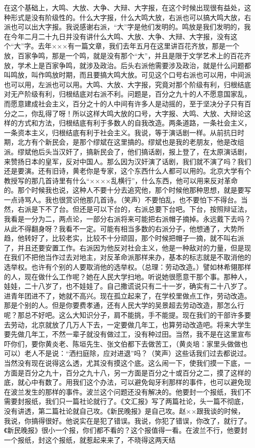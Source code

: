 在这个基础上，大鸣、大放、大争、大辩、大字报，在这个时候出现很有益处，这种形式是没有阶级性的。什么大字报，什么大鸣大放，右派也可以搞大鸣大放，右派也可以出大字报。我说感谢右派，“大”字是他们发明的。鸣放是我们发明的，我在今年二月二十九日并没有讲什么大鸣、大放、大争、大辩、大字报，没有这个“大”字。去年×××有一篇文章，我们去年五月在这里讲百花齐放，那是一个放，百家争鸣，那是一个鸣，就是没有那个“大”，并且是限于文学艺术上的百花齐放，学术上是百家争鸣，就涉及政治。后头右派他需要涉及政治，就是什么问题都叫鸣放，叫作鸣放时期，而且要搞大鸣大放。可见这个口号右派也可以用，中间派也可以用，左派也可以用。大鸣、大放、大字报，究竟对那个阶级有利，归根结底对无产阶级有利，归根结底对右派不利。问题是，百分之九十的人不愿意国家乱，而愿意建成社会主义，百分之十的人中间有许多人是动摇的，至于坚决分子只有百分之二，你乱得了呀！所以这样大鸣大放的口号，大字报、大鸣、大放、大辩论这样的方式和方法，归根结底有利于多数人的自我改造。两条道路，一条社会主义，一条资本主义，归根结底有利于社会主义。我说，等于演话剧一样。从前抗日时期，北方有个新民会，是那个缪斌在这里搞的。缪斌也是我的老朋友，他是改组派。缪斌他后头当汉奸了，搞新民会了，他们搞话剧，报上登了，在太原演话剧，来赞扬日本的皇军，反对中国人。那么因为汉奸演了话剧，我们就不演了吗？我们还是要演。还有旧诗，黄老你是专家，这个东西什么人都可以用的。北京大学有个教授写的那几首诗里有什么“××××乱横行”，什么东西，他可以用来反对革命的。那个时候我也说，这种人不要十分去追究他，那个时候他那种思想，就是要写一点诗骂人。我也很赏识他那几首诗。（笑声）不要怕乱，也不要怕下不得台。当然，右派是下不了台。但还是可以下台的，右派总要下台吧。下台，按照辩证法，我看是一分为二，两点论，一部分右派将来可能把右派帽子摘掉。永远戴下去吗？从此不得翻身呀？我看不一定。可能有相当多数的右派分子，他想通了，大势所趋，他转好了，比较老实，比较不十分顽固，那个时候把帽子一摘，就不叫右派了，并且还要安置工作。右派因为他反对社会主义，他是一种敌对的力量，但是现在我们不把他当作过去对地主，对反革命派那样来办，基本的标志就是不取消他的选举权。也许有个别的人要取消他的选举权。（总理：劳动改造。）譬如林希翎那样的人，现在做什么工作呢？她在人民大学扫地。听说她很愿意干那个事。那种人，娃娃，二十八岁了，也不娃娃了。自己撒谎说只有二十一岁，确实有二十八岁了。进青年团进不了，她就不高兴。现在孤立起来了，在学校里做点工作，劳动改造。那是个别的人。但是你要费孝通，还有人民大学的吴景超去劳动改造，那怎么行呢？那总不好吧。这么大知识分子，肩不能挑，手不能提。现在我们的干部许多要去劳动，北京就放了几万人下去，一定要做几年工，也算劳动改造吧。将来大学生要先做几年工，不然一辈子就没有做过工，没有种过田。当然，我不是在这里宣布吓你们，要你黄炎老、陈垣先生、张文伯都下去做苦工，（黄炎培：家里头做做也可以）老人不是说：“洒扫庭除，应对进退”吗？（笑声）这些话我们过去都说过。当然没有现在说得这么透，尤其没有摸这个底。这么闹一下，使我们摸一下底，一方面是百分之九十，百分之九十八，另一方面是百分之十或百分之二，摸了这样的底，就心中有数了。用我们这个办法，可以避免匈牙利那样的事件，也可以避免现在波兰发生的那样的事件。波兰这个问题还没有解决的。他要封一个报纸，我们不需要封报纸，我们只一篇社论就行了。《文汇报》写了两篇社论，头一篇不彻底，没有讲透，第二篇社论就自己攻。《新民晚报》是自己攻。赵××跟我谈的时候，我说，你搞得很好。他说实在是犯了错误。我说，你犯了错误，你改了，就行了。《新民晚报》很小一个报，你们都不看的？这个报值得一看。在波兰不行，他要封一个报纸，封这个报纸，就惹起来来了，不晓得这两天结